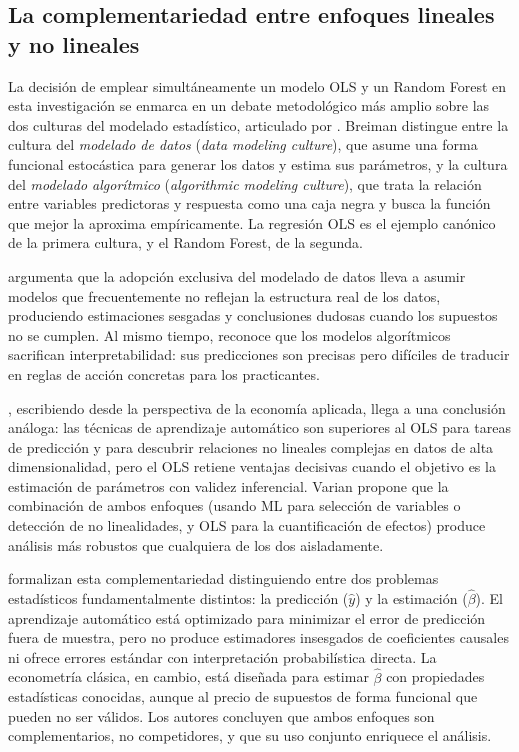 \documentclass[12pt, a4paper]{report}
\begin{document}
\subsection{La complementariedad entre enfoques lineales y no lineales}

La decisión de emplear simultáneamente un modelo OLS y un Random Forest en esta
investigación se enmarca en un debate metodológico más amplio sobre las dos culturas
del modelado estadístico, articulado por \citet{breiman2001b}. Breiman distingue entre
la cultura del \textit{modelado de datos} (\textit{data modeling culture}), que asume
una forma funcional estocástica para generar los datos y estima sus parámetros, y la
cultura del \textit{modelado algorítmico} (\textit{algorithmic modeling culture}), que
trata la relación entre variables predictoras y respuesta como una caja negra y busca
la función que mejor la aproxima empíricamente. La regresión OLS es el ejemplo canónico
de la primera cultura, y el Random Forest, de la segunda.

\citet{breiman2001b} argumenta que la adopción exclusiva del modelado de datos lleva a
asumir modelos que frecuentemente no reflejan la estructura real de los datos, produciendo
estimaciones sesgadas y conclusiones dudosas cuando los supuestos no se cumplen. Al mismo
tiempo, reconoce que los modelos algorítmicos sacrifican interpretabilidad: sus predicciones
son precisas pero difíciles de traducir en reglas de acción concretas para los practicantes.

\citet{varian2014}, escribiendo desde la perspectiva de la economía aplicada, llega a una
conclusión análoga: las técnicas de aprendizaje automático son superiores al OLS para tareas
de predicción y para descubrir relaciones no lineales complejas en datos de alta dimensionalidad,
pero el OLS retiene ventajas decisivas cuando el objetivo es la estimación de parámetros con
validez inferencial. Varian propone que la combinación de ambos enfoques (usando ML para
selección de variables o detección de no linealidades, y OLS para la cuantificación de efectos)
produce análisis más robustos que cualquiera de los dos aisladamente.

\citet{mullainathan2017} formalizan esta complementariedad distinguiendo entre dos problemas
estadísticos fundamentalmente distintos: la predicción ($\hat{y}$) y la estimación ($\hat{\beta}$).
El aprendizaje automático está optimizado para minimizar el error de predicción fuera de muestra,
pero no produce estimadores insesgados de coeficientes causales ni ofrece errores estándar con
interpretación probabilística directa. La econometría clásica, en cambio, está diseñada para
estimar $\hat{\beta}$ con propiedades estadísticas conocidas, aunque al precio de supuestos de
forma funcional que pueden no ser válidos. Los autores concluyen que ambos enfoques son
complementarios, no competidores, y que su uso conjunto enriquece el análisis.
\end{document}
